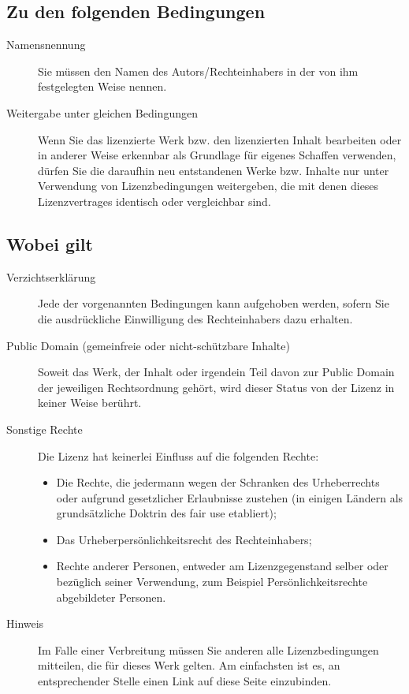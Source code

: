 \documentclass[a5paper,10pt]{article}
\begin{document}
\subsection{Zu den folgenden Bedingungen}



\begin{description}
 \item[Namensnennung] Sie müssen den Namen des Autors/Rechteinhabers in der von ihm 
festgelegten Weise nennen.


 \item[Weitergabe unter gleichen Bedingungen] Wenn Sie das lizenzierte Werk bzw. den 
lizenzierten Inhalt bearbeiten oder in anderer Weise erkennbar als Grundlage für 
eigenes Schaffen verwenden, dürfen Sie die daraufhin neu entstandenen Werke bzw. 
Inhalte nur unter Verwendung von Lizenzbedingungen weitergeben, die mit denen dieses 
Lizenzvertrages identisch oder vergleichbar sind.
 \end{description}

\subsection{Wobei gilt}

\begin{description}
    \item[Verzichtserklärung] Jede der vorgenannten Bedingungen kann aufgehoben werden, 
	  sofern Sie die ausdrückliche Einwilligung des Rechteinhabers dazu erhalten.
    \item[Public Domain (gemeinfreie oder nicht-schützbare Inhalte)] Soweit das Werk, 
	  der Inhalt oder irgendein Teil davon zur Public Domain der jeweiligen Rechtsordnung 
	  gehört, wird dieser Status von der Lizenz in keiner Weise berührt.
    \item[Sonstige Rechte] Die Lizenz hat keinerlei Einfluss auf die folgenden Rechte:
      \begin{itemize}
          \item Die Rechte, die jedermann wegen der Schranken des Urheberrechts oder 
		aufgrund gesetzlicher Erlaubnisse zustehen (in einigen Ländern als 
		grundsätzliche Doktrin des fair use etabliert);
          \item Das Urheberpersönlichkeitsrecht des Rechteinhabers;
          \item Rechte anderer Personen, entweder am Lizenzgegenstand selber oder bezüglich 
		seiner Verwendung, zum Beispiel Persönlichkeitsrechte abgebildeter Personen.
      \end{itemize}
    \item[Hinweis] Im Falle einer Verbreitung müssen Sie anderen alle Lizenzbedingungen 
	  mitteilen, die für dieses Werk gelten. Am einfachsten ist es, an entsprechender 
	  Stelle einen Link auf diese Seite einzubinden.

 \end{description}
\end{document}
